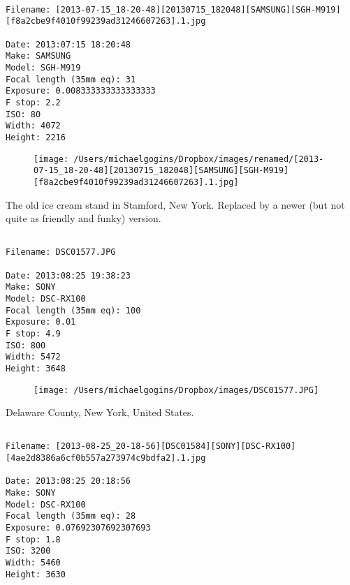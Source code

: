 \clearpage
\onecolumn
\noindent 
\noindent
\begin{lstlisting}

Filename: [2013-07-15_18-20-48][20130715_182048][SAMSUNG][SGH-M919][f8a2cbe9f4010f99239ad31246607263].1.jpg

Date: 2013:07:15 18:20:48
Make: SAMSUNG
Model: SGH-M919
Focal length (35mm eq): 31
Exposure: 0.008333333333333333
F stop: 2.2
ISO: 80
Width: 4072
Height: 2216
\end{lstlisting}
\clearpage

\begin{figure}
\texttt{[image: /Users/michaelgogins/Dropbox/images/renamed/[2013-07-15\_18-20-48][20130715\_182048][SAMSUNG][SGH-M919][f8a2cbe9f4010f99239ad31246607263].1.jpg]}
\end{figure}
    
\clearpage
\onecolumn
\noindent The old ice cream stand in Stamford, New York. Replaced by a newer (but not quite as friendly and funky) version.
\noindent
\begin{lstlisting}

Filename: DSC01577.JPG

Date: 2013:08:25 19:38:23
Make: SONY
Model: DSC-RX100
Focal length (35mm eq): 100
Exposure: 0.01
F stop: 4.9
ISO: 800
Width: 5472
Height: 3648
\end{lstlisting}
\clearpage

\begin{figure}
\texttt{[image: /Users/michaelgogins/Dropbox/images/DSC01577.JPG]}
\end{figure}
    
\clearpage
\onecolumn
\noindent Delaware County, New York, United States.
\noindent
\begin{lstlisting}

Filename: [2013-08-25_20-18-56][DSC01584][SONY][DSC-RX100][4ae2d8386a6cf0b557a273974c9bdfa2].1.jpg

Date: 2013:08:25 20:18:56
Make: SONY
Model: DSC-RX100
Focal length (35mm eq): 28
Exposure: 0.07692307692307693
F stop: 1.8
ISO: 3200
Width: 5460
Height: 3630
\end{lstlisting}
\clearpage


